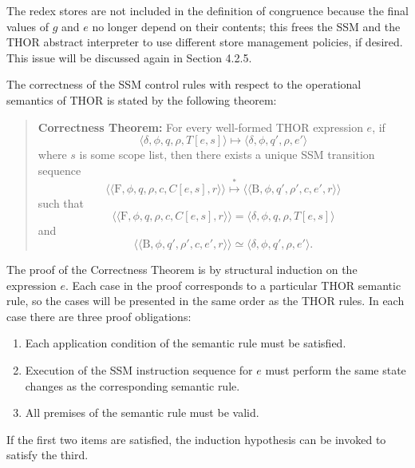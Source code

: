 The redex stores are not included in the definition of
congruence because the final values of \(g\) and \(e\) no longer depend on
their contents; this frees the SSM and the THOR abstract interpreter to use
different store management policies, if desired. This issue will be discussed
again in Section 4.2.5.

\noindent\begin{minipage}{\textwidth}
The correctness of the SSM control rules with respect to the operational
semantics of THOR is stated by the following theorem:

\begin{quote}
\textbf{Correctness Theorem:} For every well-formed THOR expression \(e\),
if
\[
\langle \delta,\phi,q,\rho,T[e,s]\rangle
\longmapsto
\langle \delta,\phi,q',\rho,e'\rangle
\]
where \(s\) is some scope list, then there exists a unique SSM transition
sequence
\[
\langle\!\langle \mathrm{F},\phi,q,\rho,c,C[e,s],r\rangle\!\rangle
\overset{*}{\longmapsto}
\langle\!\langle \mathrm{B},\phi,q',\rho',c,e',r\rangle\!\rangle
\]
such that
\[
\langle\!\langle \mathrm{F},\phi,q,\rho,c,C[e,s],r\rangle\!\rangle
= \langle \delta,\phi,q,\rho,T[e,s]\rangle
\]
and
\[
\langle\!\langle \mathrm{B},\phi,q',\rho',c,e',r\rangle\!\rangle
\simeq \langle \delta,\phi,q',\rho,e'\rangle.
\]
\end{quote}
\end{minipage}\par\medskip

The proof of the Correctness Theorem is by structural induction on the
expression \(e\). Each case in the proof corresponds to a particular THOR
semantic rule, so the cases will be presented in the same order as the THOR
rules. In each case there are three proof obligations:

\begin{enumerate}
\item Each application condition of the semantic rule must be satisfied.
\item Execution of the SSM instruction sequence for \(e\) must perform the same
state changes as the corresponding semantic rule.
\item All premises of the semantic rule must be valid.
\end{enumerate}

If the first two items are satisfied, the induction hypothesis can be invoked
to satisfy the third.

